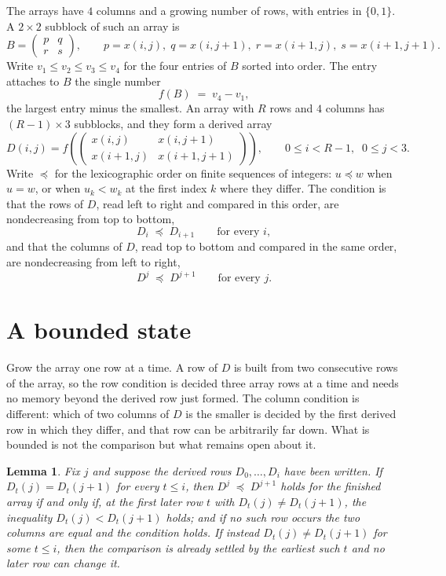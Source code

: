 \documentclass[11pt,a4paper]{article}
\theoremstyle{plain}
\newtheorem{lemma}[theorem]{Lemma}
\theoremstyle{definition}
\begin{document}
The arrays have $4$ columns and a growing number of rows, with entries in $\{0,1\}$. A
$2\times2$ subblock of such an array is
\[
B=\begin{pmatrix} p & q \\ r & s \end{pmatrix},
\qquad p=x(i,j),\; q=x(i,j+1),\; r=x(i+1,j),\; s=x(i+1,j+1).
\]
Write $v_1\le v_2\le v_3\le v_4$ for the four entries of $B$ sorted into order. The entry attaches to $B$ the single number
\[
f(B)\;=\;v_4-v_1,
\]
the largest entry minus the smallest. An array with $R$ rows and $4$ columns has $(R-1)\times3$ subblocks, and they
form a derived array
\[
D(i,j)=f\!\left(\begin{pmatrix} x(i,j) & x(i,j+1) \\ x(i+1,j) & x(i+1,j+1)\end{pmatrix}
\right),\qquad 0\le i<R-1,\;\; 0\le j<3 .
\]
Write $\preceq$ for the lexicographic order on finite sequences of integers: $u\preceq w$ when
$u=w$, or when $u_k<w_k$ at the first index $k$ where they differ. The condition is that the
rows of $D$, read left to right and compared in this order, are nondecreasing from top to bottom,
\[
D_{i}\;\preceq\;D_{i+1}\qquad\text{for every } i,
\]
and that the columns of $D$, read top to bottom and compared in the same order, are nondecreasing
from left to right,
\[
D^{j}\;\preceq\;D^{j+1}\qquad\text{for every } j .
\]

\section{A bounded state}

Grow the array one row at a time. A row of $D$ is built from two consecutive rows of the array,
so the row condition is decided three array rows at a time and needs no memory beyond the
derived row just formed. The column condition is different: which of two columns of $D$ is the
smaller is decided by the first derived row in which they differ, and that row can be
arbitrarily far down. What is bounded is not the comparison but what remains open about it.

\begin{lemma}\label{lem:bits}
Fix $j$ and suppose the derived rows $D_0,\dots,D_i$ have been written. If $D_t(j)=D_t(j+1)$ for
every $t\le i$, then $D^{j}\;\preceq\;D^{j+1}$ holds for the finished array if and only if,
at the first later row $t$ with $D_t(j)\neq D_t(j+1)$, the inequality $D_t(j)<D_t(j+1)$
holds; and if no such row occurs the two columns are equal and the condition holds. If instead
$D_t(j)\neq D_t(j+1)$ for some $t\le i$, then the comparison is already settled by the earliest
such $t$ and no later row can change it.
\end{lemma}
\end{document}

